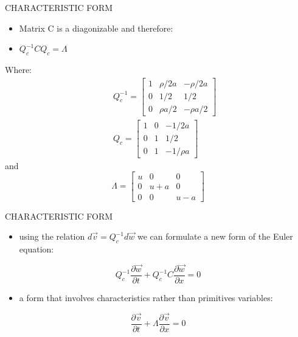 \documentclass{beamer}
\begin{document}
\begin{frame}{CHARACTERISTIC FORM}
  \begin{itemize}
   \item Matrix C is a diagonizable and therefore:
   \item $Q_c^{-1}CQ_c=\Lambda$
  \end{itemize}
Where:
  \begin{eqnarray}
    &&Q_c^{-1}=\begin{bmatrix}
    1 & \rho/2a & -\rho/2a\\ 
    0 & 1/2 & 1/2\\ 
    0 & {\rho}a/2 & -{\rho}a/2
    \end{bmatrix} \\
    &&Q_c=\begin{bmatrix}
    1 & 0 & -1/2a\\ 
    0 & 1 & 1/2 \\ 
    0 & 1 & -1/{\rho}a
    \end{bmatrix}
  \end{eqnarray}
and
  \begin{equation}
    \Lambda=\begin{bmatrix}
    u & 0 & 0\\ 
    0 & u+a & 0\\ 
    0 & 0 & u-a
    \end{bmatrix}
  \end{equation}
\end{frame}

\begin{frame}{CHARACTERISTIC FORM}
  \begin{itemize}
   \item using the relation $d\vec{v}=Q_c^{-1}d\vec{w}$ we can formulate a new form of the Euler equation:
  \end{itemize}
  \begin{equation}
    Q_c^{-1}\frac{\partial\vec{w}}{\partial{t}}+Q_c^{-1}C\frac{\partial\vec{w}}{\partial{x}}=0
  \end{equation}
  \begin{itemize}
   \item a form that involves characteristics rather than primitives variables:
  \end{itemize}
  \begin{equation}
    \frac{\partial\vec{v}}{\partial{t}}+\Lambda\frac{\partial\vec{v}}{\partial{x}}=0
  \end{equation}
\end{frame}
\end{document}
